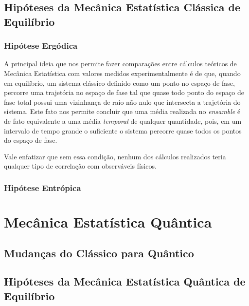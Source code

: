 \documentclass[twoside]{amsart}
\numberwithin{equation}{section}
\begin{document}
\subsection{Hipóteses da Mecânica Estatística Clássica de Equilíbrio}

\subsubsection{Hipótese Ergódica}

A principal ideia que nos permite fazer comparações entre cálculos teóricos de Mecânica Estatística com 
valores medidos experimentalmente é de que, quando em equilíbrio, um sistema clássico definido como um ponto 
no espaço de fase, percorre uma trajetória no espaço de fase tal que quase todo ponto do espaço de fase 
total possui uma vizinhança de raio não nulo que intersecta a trajetória do sistema. Este fato nos permite 
concluir que uma média realizada no \emph{ensamble} é de fato equivalente a uma média \emph{temporal} de qualquer 
quantidade, pois, em um intervalo de tempo grande o suficiente o sistema percorre quase todos os pontos do 
espaço de fase. 

Vale enfatizar que sem essa condição, nenhum dos cálculos realizados teria qualquer tipo de correlação com 
observáveis físicos.

\subsubsection{Hipótese Entrópica}



\section{Mecânica Estatística Quântica}

\subsection{Mudanças do Clássico para Quântico}

\subsection{Hipóteses da Mecânica Estatística Quântica de Equilíbrio}
\end{document}
